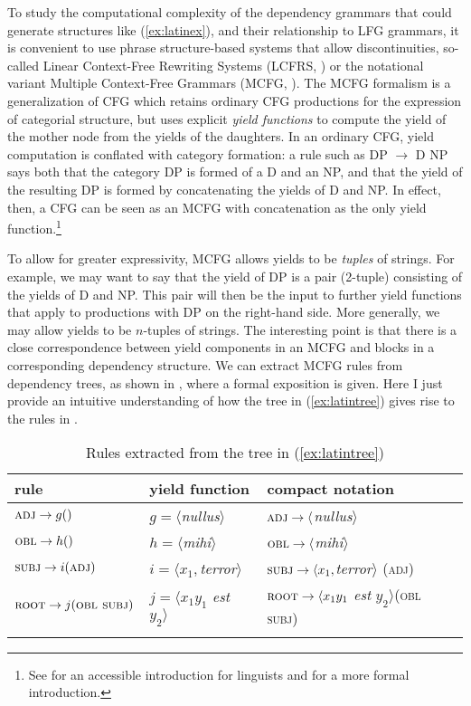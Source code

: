 \documentclass[output=paper,hidelinks]{langscibook}
\begin{document}
\hspace*{-2.5pt}To study the computational complexity of the dependency grammars that
could generate structures like (\ref{ex:latinex}), and their relationship to LFG
grammars, it is convenient to use phrase structure-based systems
that allow discontinuities, so-called Linear Context-Free Rewriting
Systems (LCFRS, \citealt{vijay-shanker-etal}) or the notational variant Multiple Context-Free
Grammars (MCFG, \citealt{SekiEtAl1991}).  The MCFG formalism is a generalization of CFG which
retains ordinary CFG productions for the expression of categorial
structure, but uses explicit \emph{yield functions} to compute the
yield of the mother node from the yields of the daughters. In an
ordinary CFG, yield computation is conflated with category formation:
a rule such as DP $\rightarrow$ D NP says both that the category DP is
formed of a D and an NP, and that the yield of the resulting DP is
formed by concatenating the yields of D and NP. In effect, then, a CFG
can be seen as an MCFG with concatenation as the only yield
function.\footnote{See \textcite{clark2014} for an accessible
introduction for linguists and \citet[chapter 6]{Kallmeyer2010} for a
more formal introduction.}

To allow for greater expressivity, MCFG allows yields to be
\emph{tuples} of strings. For example, we may want to say
that the yield of DP is a pair (2-tuple) consisting of the yields of D
and NP. This pair will then be the input to further yield functions
that apply to productions with DP on the right-hand side. More
generally, we may allow yields to be $n$-tuples of strings. The interesting point is that there is a close
correspondence between yield components in an MCFG and blocks in a
corresponding dependency structure. We can extract MCFG rules from
dependency trees, as shown in \textcite{Kuhlmann2013}, where a formal
exposition is given. Here I just provide an intuitive understanding of
how the tree in (\ref{ex:latintree}) gives rise to the rules
in .

\begin{table}
  \begin{tabular}{lll}\lsptoprule
    rule & yield function & compact notation \\\midrule
  $\textsc{adj} \rightarrow g()$ & $g=\langle$\textit{nullus}$\rangle$   & $\textsc{adj} \rightarrow \langle$\textit{nullus}$\rangle$ \\
  $\textsc{obl} \rightarrow h()$ & $h=\langle$\textit{mihi}$\rangle$ & $\textsc{obl} \rightarrow \langle$\textit{mihi}$\rangle$\\
  $\textsc{subj} \rightarrow i(\textsc{adj})$ & $i=\langle x_1,$\textit{terror}$\rangle$ & $\textsc{subj} \rightarrow \langle x_1,$\textit{terror}$\rangle$ (\textsc{adj})\\
  $\textsc{root} \rightarrow j(\textsc{obl subj})$ & $j=\langle x_1 y_1$ \textit{est} $y_2\rangle$ & $\textsc{root} \rightarrow \langle x_1 y_1$ \textit{est} $y_2\rangle$(\textsc{obl subj})\\\lspbottomrule
\end{tabular}
\caption{Rules extracted from the tree in (\ref{ex:latintree})}\label{tbl:mcfgrules}
\end{table}
\end{document}
